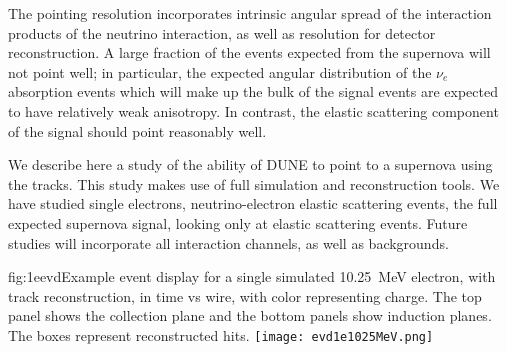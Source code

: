 The pointing resolution incorporates intrinsic angular spread of the interaction products of the neutrino interaction, as well as resolution for detector reconstruction.  A large fraction of the events expected from the supernova will not point well; in particular, the expected angular distribution of the $\nu_e$  absorption events which will make up the bulk of the signal events are expected to have relatively weak anisotropy.  In contrast, the elastic scattering component of the signal should point reasonably well.

We describe here a study of the ability of DUNE to point to a
supernova using the  tracks.  This study makes use of full 
simulation and reconstruction tools.
We have studied single electrons, neutrino-electron elastic scattering
events, the full expected supernova signal, looking only at elastic
scattering events.  Future studies will incorporate all interaction
channels, as well as backgrounds.


\begin{dunefigure}{fig:1eevd}{Example event display for a
    single simulated 10.25~MeV electron, with track reconstruction, in
    time vs wire, with color representing charge.
    The top panel shows the collection plane and the bottom panels
    show induction planes.  The boxes represent reconstructed hits. }
 \texttt{[image: evd1e1025MeV.png]}
\end{dunefigure}




